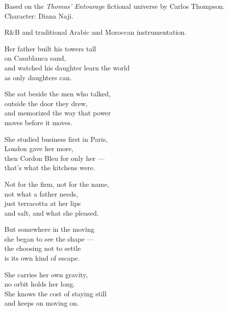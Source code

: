
\label{sec:diana-carries-her-own-gravity}

\begin{notes}
Based on the \emph{Thomas’ Entourage} fictional universe by Carlos Thompson.\\
Character: Diana Naji.\\
\end{notes}

\begin{style}
R\&B and traditional Arabic and Moroccan instrumentation.
\end{style}

\begin{lyrics}

Her father built his towers tall\\
on Casablanca sand,\\
and watched his daughter learn the world\\
as only daughters can.

She sat beside the men who talked,\\
outside the door they drew,\\
and memorized the way that power\\
moves before it moves.

She studied business first in Paris,\\
London gave her more,\\
then Cordon Bleu for only her —\\
that's what the kitchens were.

Not for the firm, not for the name,\\
not what a father needs,\\
just terracotta at her lips\\
and salt, and what she pleased.

But somewhere in the moving\\
she began to see the shape —\\
the choosing not to settle\\
is its own kind of escape.


She carries her own gravity,\\
no orbit holds her long.\\
She knows the cost of staying still\\
and keeps on moving on.


\end{lyrics}

